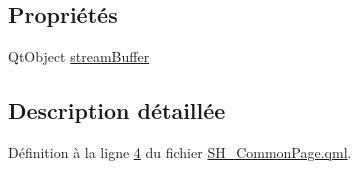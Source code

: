 \subsection*{Propriétés}
\begin{DoxyCompactItemize}
\item 
Qt\-Object \hyperlink{classSH__CommonPage_af59ae18e73706e3622c000c2005d9550}{stream\-Buffer}
\end{DoxyCompactItemize}


\subsection{Description détaillée}


Définition à la ligne \hyperlink{SH__CommonPage_8qml_source_l00004}{4} du fichier \hyperlink{SH__CommonPage_8qml_source}{S\-H\-\_\-\-Common\-Page.\-qml}.



